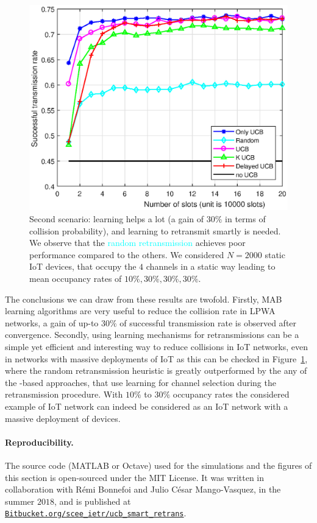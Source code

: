 \begin{figure}[h!]  %
	\centering
	\includegraphics[width=0.90\linewidth]{ResultsUCB2.eps}
	\caption[Second comparison between the exposed heuristics for the retransmission: ``Only \UCB'', ``Random'', ``\UCB'', ``$K$ \UCB'', and ``Delayed \UCB''.]{
		Second scenario: learning helps a lot (a gain of $30\%$ in terms of collision probability), and learning to retransmit smartly is needed.
		We observe that the \textcolor{cyan}{random retransmission} achieves poor performance compared to the others.
		We considered $N=2000$ static IoT devices, that occupy the $4$ channels in a static way leading to mean occupancy rates of $10\%,30\%,30\%,30\%$.
	}
	\label{fig:43:mainExperiment2}
\end{figure}

The conclusions we can draw from these results are twofold.
Firstly, MAB learning algorithms are very useful to reduce the collision rate in LPWA networks, a gain of up-to $30\%$ of successful transmission rate is observed after convergence.
Secondly, using learning mechanisms for retransmissions can be a simple yet efficient and interesting way to reduce collisions in IoT networks, even in networks with massive deployments of IoT as this can be checked in Figure~\ref{fig:43:mainExperiment2}, where the random retransmission heuristic is greatly outperformed by the any of the \UCB-based approaches, that use learning for channel selection during the retransmission procedure.
With $10\%$ to $30\%$ occupancy rates the considered example of IoT network can indeed be considered as an IoT network with a massive deployment of devices.


\paragraph{Reproducibility.}
%
The source code (MATLAB or Octave) used for the simulations and the figures of this section is open-sourced under the MIT License.
It was written in collaboration with Rémi Bonnefoi and Julio César Mango-Vasquez, in the summer $2018$,
and is published at \href{https://Bitbucket.org/scee_ietr/ucb_smart_retrans}{\texttt{Bitbucket.org/scee\_ietr/ucb\_smart\_retrans}}.
